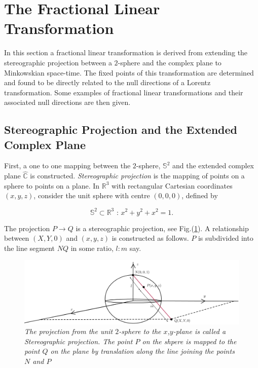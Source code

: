 \section{The Fractional Linear Transformation}\label{Fractional_Section_Extended_Complex}

In this section a fractional linear transformation is derived from extending the stereographic projection between a $2$-sphere and the complex plane to Minkowskian space-time. The fixed points of this transformation are determined and found to be directly related to the null directions of a Lorentz transformation. Some examples of fractional linear transformations and their associated null directions are then given. 

\subsection{Stereographic Projection and the Extended Complex Plane}\label{Section_Stereographic_Extended_Complex}

First, a one to one mapping between the $2$-sphere, $\mathbb{S}^2$ and the extended complex plane $\hat{\mathbb{C}}$ is constructed. \textit{Stereographic projection} is the mapping of points on a sphere to points on a plane. In $\mathbb{R}^3$ with rectangular Cartesian coordinates $(x, y, z)$, consider the unit sphere with centre $(0,0,0)$, defined by

\begin{equation*}
\mathbb{S}^2 \subset \mathbb{R}^3 \text{ : } x^2 + y^2 + x^2 = 1.
\end{equation*}

\noindent The projection $P \rightarrow Q$ is a stereographic projection, see Fig.(\ref{Stereographic_Projecttion_Fig}). A relationship between $(X,Y,0)$ and $(x,y,z)$ is constructed as follows. $P$ is subdivided into the line segment $NQ$ in some ratio, $l:m$ say. 

\begin{figure}[h!]
\begin{center}
\caption{\textit{The projection from the unit $2$-sphere to the $x$,$y$-plane is called a Stereographic projection. The point $P$ on the shpere is mapped to the point $Q$ on the plane by translation along the line joining the points $N$ and $P$}}
\label{Stereographic_Projecttion_Fig}
\includegraphics[scale=0.50]{figs/4_1.jpg}
\end{center}
\end{figure}

